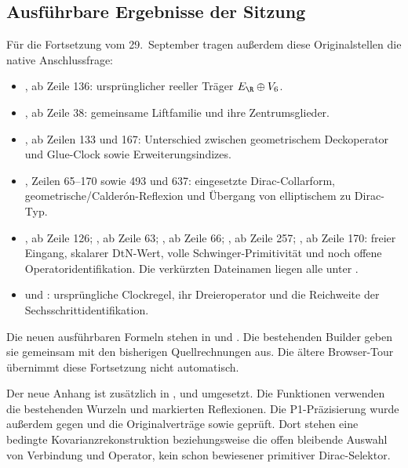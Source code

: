 \subsection{Ausführbare Ergebnisse der Sitzung}
Für die Fortsetzung vom 29.~September tragen außerdem diese Originalstellen die native Anschlussfrage:
\begin{itemize}
\item {}, ab Zeile 136: ursprünglicher reeller Träger $E_{\R}\oplus V_6$.
\item {}, ab Zeile 38: gemeinsame Liftfamilie und ihre Zentrumsglieder.
\item {}, ab Zeilen 133 und 167: Unterschied zwischen geometrischem Deckoperator und Glue-Clock sowie Erweiterungsindizes.
\item {}, Zeilen 65--170 sowie 493 und 637: eingesetzte Dirac-Collarform, geometrische/Calderón-Reflexion und Übergang von elliptischem zu Dirac-Typ.
\item {}, ab Zeile 126; , ab Zeile 63; , ab Zeile 66; , ab Zeile 257; , ab Zeile 170: freier Eingang, skalarer DtN-Wert, volle Schwinger-Primitivität und noch offene Operatoridentifikation. Die verkürzten Dateinamen liegen alle unter .
\item {} und : ursprüngliche Clockregel, ihr Dreieroperator und die Reichweite der Sechsschrittidentifikation.
\end{itemize}
Die neuen ausführbaren Formeln stehen in  und . Die bestehenden Builder geben sie gemeinsam mit den bisherigen Quellrechnungen aus. Die ältere Browser-Tour übernimmt diese Fortsetzung nicht automatisch.

Der neue Anhang ist zusätzlich in ,
 und
 umgesetzt.
Die Funktionen verwenden die bestehenden Wurzeln und markierten Reflexionen. Die P1-Präzisierung wurde außerdem gegen  und die Originalverträge  sowie  geprüft. Dort stehen eine bedingte Kovarianzrekonstruktion beziehungsweise die offen bleibende Auswahl von Verbindung und Operator, kein schon bewiesener primitiver Dirac-Selektor.

